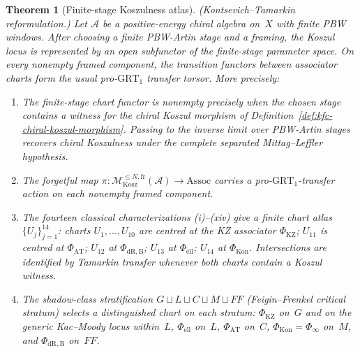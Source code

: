 \documentclass[11pt,reqno]{amsart}
\newtheorem{theorem}{Theorem}[section]
\theoremstyle{definition}
\theoremstyle{remark}
\newcommand{\cA}{\mathcal{A}}
\newcommand{\cM}{\mathcal{M}}
\numberwithin{equation}{section}
\begin{document}
\begin{theorem}[Finite-stage Koszulness atlas]
\label{thm:koszulness-moduli}
\textup{(Kontsevich--Tamarkin reformulation.)}
Let $\cA$ be a positive-energy chiral algebra on~$X$ with finite
PBW windows. After choosing a finite PBW-Artin stage and a framing,
the Koszul locus is represented by an open subfunctor of the
finite-stage parameter space. On every nonempty framed component,
the transition functors between associator charts form the usual
pro-\(\mathrm{GRT}_1\) transfer torsor. More precisely:
\begin{enumerate}[label=\textup{(A\arabic*)},leftmargin=3em]
\item\label{item:moduli-A1}
  The finite-stage chart functor is nonempty precisely when the
  chosen stage contains a witness for the chiral Koszul morphism of
  Definition~\textup{\ref{def:kfc-chiral-koszul-morphism}}.
  Passing to the inverse limit over PBW-Artin stages recovers
  chiral Koszulness under the complete separated
  Mittag--Leffler hypothesis.
\item\label{item:moduli-A2}
  The forgetful map
  $\pi\colon
  \cM_{\mathrm{Kosz}}^{\leq N,\mathrm{fr}}(\cA)
  \to \mathrm{Assoc}$
  carries a pro-\(\mathrm{GRT}_1\)-transfer action on each
  nonempty framed component.
\item\label{item:moduli-A3}
  The fourteen classical characterizations
  \textup{(i)}--\textup{(xiv)} give a finite chart atlas
  $\{U_j\}_{j=1}^{14}$: charts $U_1,\ldots,U_{10}$ are
  centred at the KZ associator $\Phi_{\mathrm{KZ}}$;
  $U_{11}$ is centred at $\Phi_{\mathrm{AT}}$;
  $U_{12}$ at $\Phi_{\mathrm{dR,B}}$;
  $U_{13}$ at $\Phi_{\mathrm{ell}}$;
  $U_{14}$ at $\Phi_{\mathrm{Kon}}$.
  Intersections are identified by Tamarkin transfer whenever both
  charts contain a Koszul witness.
\item\label{item:moduli-A4}
  The shadow-class stratification
  $G \sqcup L \sqcup C \sqcup M \sqcup FF$ \textup{(}Feigin--Frenkel
  critical stratum\textup{)} selects a distinguished chart on each
  stratum: $\Phi_{\mathrm{KZ}}$ on~$G$ and on the generic
  Kac--Moody locus within~$L$, $\Phi_{\mathrm{ell}}$ on~$L$,
  $\Phi_{\mathrm{AT}}$ on~$C$, $\Phi_{\mathrm{Kon}} = \Phi_\infty$
  on~$M$, and $\Phi_{\mathrm{dR,B}}$ on~$FF$.
\end{enumerate}
\end{theorem}
\end{document}
